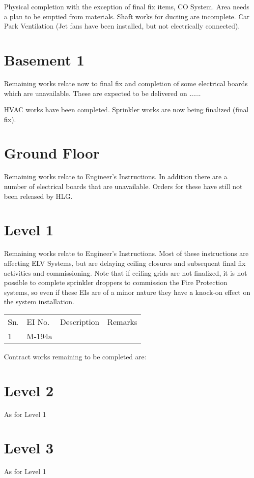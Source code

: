 Physical completion with the exception of final fix items, CO System. Area needs a plan to be emptied from materials. Shaft works for ducting are incomplete. Car Park Ventilation (Jet fans have been installed, but not 
electrically connected).

\section{Basement 1}

Remaining works relate now to final fix and completion of some electrical boards which are unavailable. These are expected to be delivered on ......

HVAC works have been completed. Sprinkler works are now being finalized (final fix).

\section{Ground Floor}

Remaining works relate to Engineer's Instructions. In addition there are a number of electrical boards that are unavailable. Orders for these have still not been released by HLG.

\section{Level 1}
Remaining works relate to Engineer's Instructions. Most of these instructions are affecting ELV Systems, but are delaying ceiling closures and subsequent final fix activities and commissioning. Note that if ceiling grids are not finalized, it is not possible to complete sprinkler droppers to commission the Fire Protection systems, so even if these EIs are of a minor nature they have a knock-on effect on the system installation.

\begin{tabular}{llll}
\toprule
Sn.   &EI No. & Description & Remarks\\
1      & M-194a &               &             \\
\end{tabular}

Contract works remaining to be completed are:

\section{Level 2}
As for Level 1
\section{Level 3}
As for Level 1
